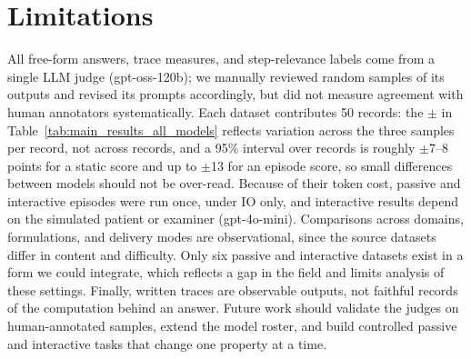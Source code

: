 

\FloatBarrier

\section{Limitations}
\label{sec:future_work}
\label{sec:limitations}

All free-form answers, trace measures, and step-relevance labels come from a single LLM judge (gpt-oss-120b); we manually reviewed random samples of its outputs and revised its prompts accordingly, but did not measure agreement with human annotators systematically. Each dataset contributes 50 records: the $\pm$ in Table~\ref{tab:main_results_all_models} reflects variation across the three samples per record, not across records, and a 95\% interval over records is roughly $\pm$7--8 points for a static score and up to $\pm$13 for an episode score, so small differences between models should not be over-read. Because of their token cost, passive and interactive episodes were run once, under IO only, and interactive results depend on the simulated patient or examiner (gpt-4o-mini). Comparisons across domains, formulations, and delivery modes are observational, since the source datasets differ in content and difficulty. Only six passive and interactive datasets exist in a form we could integrate, which reflects a gap in the field and limits analysis of these settings. Finally, written traces are observable outputs, not faithful records of the computation behind an answer. Future work should validate the judges on human-annotated samples, extend the model roster, and build controlled passive and interactive tasks that change one property at a time.


